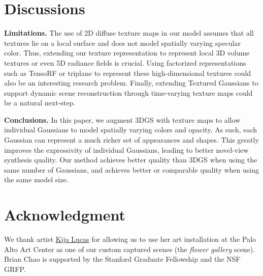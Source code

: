 \section{Discussions}


\noindent \textbf{Limitations.} 
The use of 2D diffuse texture maps in our model assumes that all textures lie on a local surface and does not model spatially varying specular color. Thus, extending our texture representation to represent local 3D volume textures or even 5D radiance fields is crucial. Using factorized representations such as TensoRF \cite{Chen2022ECCVtensorf} or triplane \cite{Chan2021eg3d} to represent these high-dimensional textures could also be an interesting research problem. Finally, extending Textured Gaussians to support dynamic scene reconstruction \cite{yang2023deformable3dgs, shih2024modeling} through time-varying texture maps could be a natural next-step.

\noindent \textbf{Conclusions.} 
In this paper, we augment 3DGS with texture maps to allow individual Gaussians to model spatially varying colors and opacity. As such, each Gaussian can represent a much richer set of appearances and shapes. This greatly improves the expressivity of individual Gaussians, leading to better novel-view synthesis quality. Our method achieves better quality than 3DGS when using the same number of Gaussians, and achieves better or comparable quality when using the same model size. 

\section*{Acknowledgment}
We thank artist \href{https://www.kijalucas.com/}{Kija Lucas} for allowing us to use her art installation at the Palo Alto Art Center as one of our custom captured scenes (the \textit{flower gallery} scene). Brian Chao is supported by the Stanford Graduate Fellowship and the NSF GRFP. 
